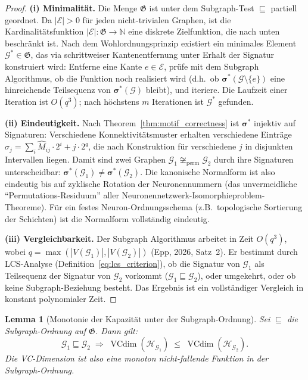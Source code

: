 ﻿\documentclass[12pt, a4paper, openany]{report}
\newtheorem{lemma}[theorem]{Lemma}
\newcommand{\N}{\mathbb{N}}
\newcommand{\calG}{\mathcal{G}}
\newcommand{\calH}{\mathcal{H}}
\newcommand{\calE}{\mathcal{E}}
\DeclareMathOperator{\VC}{VCdim}
\begin{document}
\begin{proof}
\textbf{(i) Minimalität.}
Die Menge $\mathfrak{G}$ ist unter dem Subgraph-Test $\sqsubseteq$ partiell
geordnet.  Da $|\calE| > 0$ für jeden nicht-trivialen Graphen, ist die
Kardinalitätsfunktion $|\calE| : \mathfrak{G} \to \N$ eine diskrete
Zielfunktion, die nach unten beschränkt ist.  Nach dem
Wohlordnungsprinzip existiert ein minimales Element $\calG^* \in \mathfrak{G}$,
das via schrittweiser Kantenentfernung unter Erhalt der Signatur konstruiert
wird: Entferne eine Kante $e \in \calE$, prüfe mit dem Subgraph Algorithmus,
ob die Funktion noch realisiert wird (d.h.\ ob $\bm{\sigma}^*(\calG \setminus \{e\})$
eine hinreichende Teilsequenz von $\bm{\sigma}^*(\calG)$ bleibt), und iteriere.
Die Laufzeit einer Iteration ist $O(q^3)$; nach höchstens $m$ Iterationen
ist $\calG^*$ gefunden.

\textbf{(ii) Eindeutigkeit.}
Nach Theorem~\ref{thm:motif_correctness} ist $\bm{\sigma}^*$ injektiv auf
Signaturen: Verschiedene Konnektivitätsmuster erhalten verschiedene Einträge
$\sigma_j = \sum_i \hat{M}_{ij} \cdot 2^i + j \cdot 2^q$, die nach
Konstruktion für verschiedene $j$ in disjunkten Intervallen liegen.  Damit
sind zwei Graphen $\calG_1 \not\cong_{\mathrm{perm}} \calG_2$ durch ihre
Signaturen unterscheidbar: $\bm{\sigma}^*(\calG_1) \neq \bm{\sigma}^*(\calG_2)$.
Die kanonische Normalform ist also eindeutig bis auf zyklische Rotation
der Neuronennummern (das unvermeidliche ``Permutations-Residuum'' aller
Neuronennetzwerk-Isomorphieproblem-Theoreme).  Für ein festes Neuron-Ordnungsschema
(z.B.\ topologische Sortierung der Schichten) ist die Normalform vollständig
eindeutig.

\textbf{(iii) Vergleichbarkeit.}
Der Subgraph Algorithmus arbeitet in Zeit $O(q^3)$, wobei $q = \max(|V(\calG_1)|,
|V(\calG_2)|)$ (Epp, 2026, Satz~2).  Er bestimmt durch LCS-Analyse
(Definition~\ref{eq:lcs_criterion}), ob die Signatur von $\calG_1$ als
Teilsequenz der Signatur von $\calG_2$ vorkommt ($\calG_1 \sqsubseteq \calG_2$),
oder umgekehrt, oder ob keine Subgraph-Beziehung besteht.  Das Ergebnis
ist ein vollständiger Vergleich in konstant polynomialer Zeit.
\end{proof}

\begin{lemma}[Monotonie der Kapazität unter der Subgraph-Ordnung]
\label{lem:capacity_monotone}
Sei $\sqsubseteq$ die Subgraph-Ordnung auf $\mathfrak{G}$.  Dann gilt:
\[
  \calG_1 \sqsubseteq \calG_2
  \;\Rightarrow\;
  \VC(\calH_{\calG_1}) \;\leq\; \VC(\calH_{\calG_2}).
\]
Die VC-Dimension ist also eine monoton nicht-fallende Funktion in der
Subgraph-Ordnung.
\end{lemma}
\end{document}
